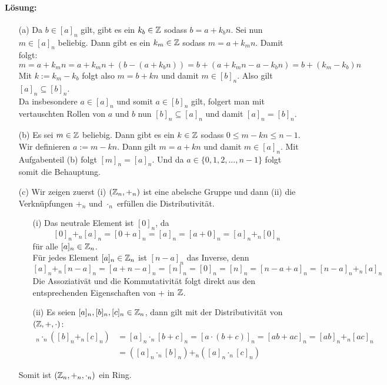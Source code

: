 \documentclass[
				a4paper,
				10pt
			]
			{scrartcl}
\begin{document}
\paragraph{L\"osung:}
\begin{itemize}
\item[(a)]
Da $b \in [a]_n$ gilt, gibt es ein $k_b\in \mathbb{Z}$ sodass $b=a+k_b n$. Sei nun $m \in [a]_n$ beliebig. Dann gibt es ein $k_m \in \mathbb{Z}$ sodass $m=a+k_m n$. Damit folgt:
$$
m=a+k_m n = a+k_m n + (b- (a+k_b n))=b + (a+k_m n -a- k_b n) =b + (k_m-k_b)n
$$
Mit $k:=k_m -k_b$ folgt also $m=b+kn$ und damit $m \in [b]_n$. Also gilt $[a]_n \subseteq [b]_n$.\\
Da insbesondere $a \in [a]_n$ und somit $a\in [b]_n$ gilt, folgert man mit vertauschten Rollen von $a$ und $b$ nun $[b]_n \subseteq [a]_n$ und damit $[a]_n=[b]_n$.

\item[(b)]
Es sei $m \in \mathbb{Z}$ beliebig. Dann gibt es ein $k \in \mathbb{Z}$ sodass $0\le m-kn \le n-1$. Wir definieren $a:=m-kn$. Dann gilt $m=a+kn$ und damit $m \in [a]_n$. Mit Aufgabenteil (b) folgt $[m]_n=[a]_n$. Und da $a \in \{0,1,2,...,n-1\}$ folgt somit die Behauptung.

\item[(c)]
Wir zeigen zuerst (i) $(\mathbb{Z}_n,+_n)$ ist eine abelsche Gruppe und dann (ii) die Verkn\"upfungen $+_n$ und $\cdot_n$ erf\"ullen die Distributivit\"at.
\begin{itemize}
\item[(i)]
Das neutrale Element ist $[0]_n$, da 
$$[0]_n+_n[a]_n=[0+a]_n=[a]_n=[a+0]_n=[a]_n+_n[0]_n$$
f\"ur alle $[a]_n \in \mathbb{Z}_n$.\\
F\"ur jedes Element $[a]_n \in \mathbb{Z}_n$ ist $[n-a]_n$ das Inverse, denn 
$$[a]_n+_n[n-a]_n=[a+n-a]_n=[n]_n=[0]_n=[n]_n=[n-a+a]_n=[n-a]_n+_n[a]_n$$
Die Assoziativ\"at und die Kommutativit\"at folgt direkt aus den entsprechenden Eigenschaften von $+$ in $\mathbb{Z}$.
\item[(ii)]
Es seien $[a]_n,[b]_n,[c]_n \in \mathbb{Z}_n$, dann gilt mit der Distributivit\"at von $(\mathbb{Z},+,\cdot)$:
\begin{align*}
[a]_n \cdot_n ([b]_n +_n [c]_n)&=[a]_n\cdot_n [b+c]_n=[a\cdot (b+c)]_n=[ab+ac]_n=[ab]_n+_n[ac]_n\\
&=([a]_n\cdot_n[b]_n) +_n ([a]_n\cdot_n[c]_n)
\end{align*}
\end{itemize}
Somit ist $(\mathbb{Z}_n,+_n,\cdot_n)$ ein Ring.

\end{itemize}
\end{document}
